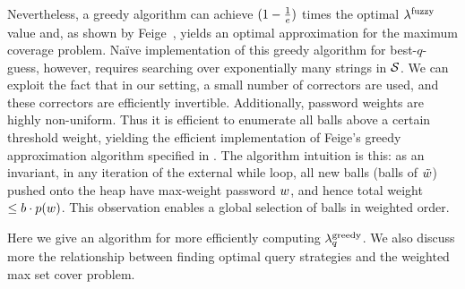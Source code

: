 






Nevertheless, a greedy algorithm can achieve
$(1-{1\over e})$ times the optimal $\lambda^\textnormal{fuzzy}$ value and, as shown by  Feige~\cite{feige1998threshold,nemhauser1978analysis}, yields
an optimal approximation
for the maximum coverage problem. Na\"{i}ve implementation of this
greedy algorithm for best-$q$-guess, however, requires searching over
exponentially many strings in $\mathcal{S}$. We can exploit the fact that in our setting, a small number of correctors are used, and these correctors are efficiently invertible. Additionally, password weights are highly non-uniform. Thus it is efficient to enumerate all balls above a certain threshold weight, yielding the efficient implementation of Feige's greedy
approximation algorithm specified in . The algorithm intuition is this: as an invariant, in any iteration of the
external while loop, all new balls (balls of $\tilde{w}$) pushed onto
the heap have max-weight password ${w}$, and
hence total weight $\le b\cdot p({w})$. This observation enables a global selection of balls in weighted order.


\iffalse
Here we give an algorithm for more efficiently computing $\lambda^\textnormal{greedy}_q$. We
also discuss more the relationship between finding optimal query strategies and 
the weighted max set cover problem. 

